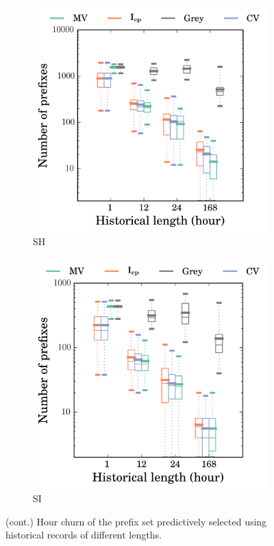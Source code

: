 \begin{figure}
\begin{subfigure}[b]{0.48\textwidth}
                \includegraphics[width=\textwidth]{gfx/chap2/grey_churn_box_method_compare_fs_sh.png}
                \caption{SH}
                \label{fig:churn_sh}
        \end{subfigure}
        \begin{subfigure}[b]{0.48\textwidth}
                \includegraphics[width=\textwidth]{gfx/chap2/grey_churn_box_method_compare_fs_si.png}
                \caption{SI}
                \label{fig:churn_si}
        \end{subfigure}
\caption{(cont.) Hour churn of the prefix set predictively selected using historical records of different lengths.}
\label{fig:churn_cont}
\end{figure}

